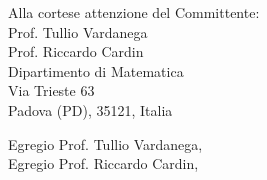 \documentclass[11pt, a4paper]{letter} %
\begin{document}

\begin{letter}{
	\-\\\-\\\-\\\-\\\-\\
	Alla cortese attenzione del Committente:	\\
	Prof. Tullio Vardanega\\
	Prof. Riccardo Cardin\\	
	Dipartimento di Matematica\\ 
	Via Trieste 63\\ 
	Padova (PD), 35121, Italia
}


\opening{Egregio Prof.  Tullio Vardanega,\\
	Egregio Prof.  Riccardo Cardin,\\}


\end{letter}
\end{document}
